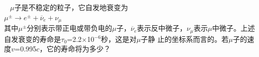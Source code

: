 \begin{exercises}
\exercise ~ $\mu$子是不稳定的粒子，它自发地衰变为 \vspace{-0.2em} \\
\null\hspace{6em} $\mu ^ \pm \longrightarrow e ^ \pm + \overline{\nu} _ { e } + \nu _ { \mu }$ \vspace{-0.2em} \\
{其中\*$\mu ^ \pm$\*分别表示带正电或带负电的\*$\mu$\*子，\!$\overline{\nu} _ { e }$\*表示反中微子，\!$\nu _ { \mu}$\*表示$\mu$\*中微子。上述自发衰变的寿命是\*$ \tau _ { 0 }$=2.2$\times$10$^{-6}$\*秒，这是对\*$\mu$\*子静
止的坐标系而言的。\!若\*$\mu$\*子的速度\*$ v$=0.995$c$，\!它的寿命将为多少？}
\end{exercises}

